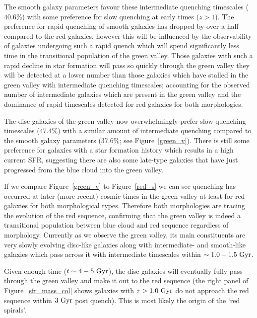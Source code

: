 The smooth galaxy parameters favour these intermediate quenching timescales ($40.6\%$) with some preference for slow quenching at  early times ($z > 1$). The preference for rapid quenching of smooth galaxies has dropped by over a half compared to the red galaxies, however this will be influenced by the observability of galaxies undergoing such a rapid quench which will spend significantly less time in the transitional population of the green valley. Those galaxies with such a rapid decline in star formation will pass so quickly through the green valley they will be detected at a lower number than those galaxies which have stalled in the green valley with intermediate quenching timescales; accounting for the observed number of intermediate galaxies which are present in the green valley and the dominance of rapid timescales detected for red galaxies for both morphologies.

The disc galaxies of the green valley now overwhelmingly prefer slow quenching timescales ($47.4\%$) with a similar amount of intermediate quenching compared to the smooth galaxy parameters ($37.6\%$; see Figure~\ref{green_v}). There is still some preference for galaxies with a star formation history which results in a high current SFR, suggesting there are also some late-type galaxies that have just progressed from the blue cloud into the green valley. 

If we compare Figure~\ref{green_v} to Figure~\ref{red_s}  we can see quenching has occurred at later (more recent) cosmic times in the green valley at least for red galaxies for both morphological types. Therefore both morphologies are tracing the evolution of the red sequence, confirming that the green valley is indeed a transitional population between blue cloud and red sequence regardless of morphology. Currently as we observe the green valley, its main constituents are very slowly evolving disc-like galaxies along with intermediate- and smooth-like galaxies which pass across it with intermediate timescales within $\sim 1.0-1.5~\rm{Gyr}$.

Given enough time ($t\sim4 - 5~\rm{Gyr}$), the disc galaxies will eventually fully pass through the green valley and make it out to the red sequence (the right panel of Figure~\ref{sfr_mass_col} shows galaxies with $\tau > 1.0~\rm{Gyr}$ do not approach the red sequence within $3~\rm{Gyr}$ post quench). This is most likely the origin of the `red spirals'.

